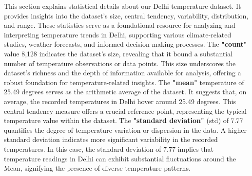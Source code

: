 This section explains statistical details about our Delhi temperature dataset. It provides insights into the dataset's size, central tendency, variability, distribution, and range. These statistics serve as a foundational resource for analyzing and interpreting temperature trends in Delhi, supporting various climate-related studies, weather forecasts, and informed decision-making processes. The \textbf{"count"} value 8,128 indicates the dataset's size, revealing that it bound a substantial number of temperature observations or data points. This size underscores the dataset's richness and the depth of information available for analysis, offering a robust foundation for temperature-related insights. The \textbf{"mean"} temperature of 25.49 degrees serves as the arithmetic average of the dataset. It suggests that, on average, the recorded temperatures in Delhi hover around 25.49 degrees. This central tendency measure offers a crucial reference point, representing the typical temperature value within the dataset. The \textbf{"standard deviation"} (std) of 7.77 quantifies the degree of temperature variation or dispersion in the data. A higher standard deviation indicates more significant variability in the recorded temperatures. In this case, the standard deviation of 7.77 implies that temperature readings in Delhi can exhibit substantial fluctuations around the Mean, signifying the presence of diverse temperature patterns.

